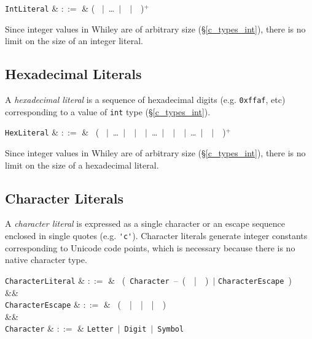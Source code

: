 \begin{syntax}
  \verb+IntLiteral+ & $::=$ & \big( \ $|$\ \ldots\ $|$\ \ $|$\ \token{\_}\ \big)$^+$ \\
\end{syntax}

Since integer values in Whiley are of arbitrary size (\S\ref{c_types_int}), there is no limit on the size of an integer literal.

\subsection{Hexadecimal Literals}

A {\em hexadecimal literal} is a sequence of hexadecimal digits (e.g. \lstinline{0xffaf}, etc) corresponding to a value of \lstinline{int} type (\S\ref{c_types_int}).

\begin{syntax}
  \verb+HexLiteral+ & $::=$ &  \ \big( \ $|$\ \ldots\ $|$\ \ $|$\ \ $|$\ \ldots\ $|$\ \ $|$\ \ $|$\ \ldots\ $|$\ \ $|$\ \token{\_}\ \big)$^+$\\
\end{syntax}

Since integer values in Whiley are of arbitrary size (\S\ref{c_types_int}), there is no limit on the size of a hexadecimal literal.

\subsection{Character Literals}

A {\em character literal} is expressed as a single character or an escape sequence enclosed in single quotes (e.g. \lstinline{'c'}).  Character literals generate integer constants corresponding to Unicode code points, which is necessary because there is no native character type.

\begin{syntax}
  \verb+CharacterLiteral+ & $::=$ & \ \Big(\ \verb+Character+\ --\ \big(\ \token{\textbackslash}\ |\ \ \big)\ $|$ \verb+CharacterEscape+\ \Big)\  \\
  &&\\
  \verb+CharacterEscape+ & $::=$ & \token{\textbackslash}\ \big(\ \token{\textbackslash}\ |\ \ |\ \ |\ \ \big)\\
  &&\\
  \verb+Character+ & $::=$ & \verb+Letter+\ $|$\ \verb+Digit+\ $|$\ \verb+Symbol+\\

\end{syntax}

